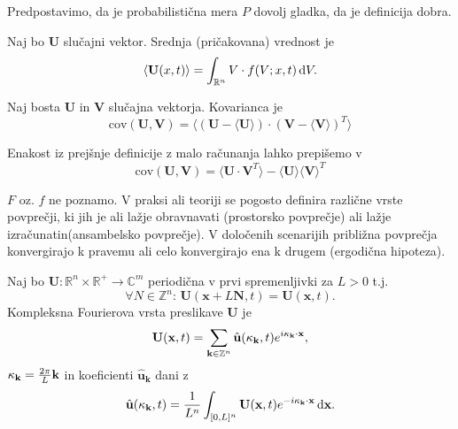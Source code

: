 \documentclass[mat2, tisk]{fmfdelo}
\newcommand{\R}{\mathbb R}
\newcommand{\Z}{\mathbb Z}
\newcommand{\bd}{\textbf}
\newcommand{\C}{\mathbb C}
\begin{document}
\begin{opomba}
Predpostavimo, da je probabilistična mera $P$ dovolj gladka, da je definicija dobra.
\end{opomba}

\begin{definicija}
Naj bo $\bd{U}$ slučajni vektor. Srednja (pričakovana) vrednost je 
\begin{equation}
\langle \bd{U}(x, t) \rangle = \int_{\R^n} V \cdot f(V; x, t) \dif V.
\end{equation}
\end{definicija}

\begin{definicija}
Naj bosta $\bd{U}$ in $\bd{V}$ slučajna vektorja. Kovarianca je 
\begin{equation}
\text{cov}(\bd{U}, \bd{V}) = \langle (\bd{U} - \langle \bd{U} \rangle)\cdot (\bd{V} - \langle \bd{V} \rangle)^T \rangle
\end{equation}
\end{definicija}

\begin{opomba}
Enakost iz prejšnje definicije z malo računanja lahko prepišemo v 
\begin{equation}
\text{cov}(\bd{U}, \bd{V}) = \langle \bd{U}\cdot \bd{V}^T \rangle - \langle \bd{U} \rangle  \langle \bd{V} \rangle^T
\end{equation}
\end{opomba}

\noindent
$F$ oz. $f$ ne poznamo. V praksi ali teoriji se pogosto definira različne vrste povprečji, 
ki jih je ali lažje obravnavati (prostorsko povprečje) ali lažje izračunatin(ansambelsko povprečje).
V določenih scenarijih približna povprečja konvergirajo k pravemu 
ali celo konvergirajo ena k drugem (ergodična hipoteza). 

\begin{definicija}
Naj bo $\bd{U}: \R^n \times \R^+ \rightarrow \C^m$ periodična v prvi spremenljivki za $L>0$ t.j. 
$$
\forall N\in \Z^n: \,\bd{U}(\bd{x} + L\bd{N}, t) = \bd{U}(\bd{x}, t).
$$
Kompleksna Fourierova vrsta preslikave $\bd{U}$ je 
\begin{equation}
\bd{U}(\bd{x}, t) = \sum_{\bd{k}\in \Z^{n}} \hat{\bd{u}}(\bd{\text{$\kappa$}}_\bd{k}, t) e^{i\bd{\text{$\kappa$}}_\bd{k} \cdot \bd{x}},
\end{equation}
$\bd{\text{$\kappa$}}_\bd{k} = \frac{2\pi}{L} \bd{k}$ in koeficienti $\hat{\bd{u}}_\bd{k}$ dani z 
\begin{equation}
\hat{\bd{u}}(\bd{\text{$\kappa$}}_\bd{k}, t) = \frac{1}{L^n} \int_{[0, L]^n} \bd{U}(\bd{x}, t) e^{-i\bd{\text{$\kappa$}}_\bd{k} \cdot \bd{x}} \dif \bd{x}.
\end{equation}
\end{definicija}
\end{document}
